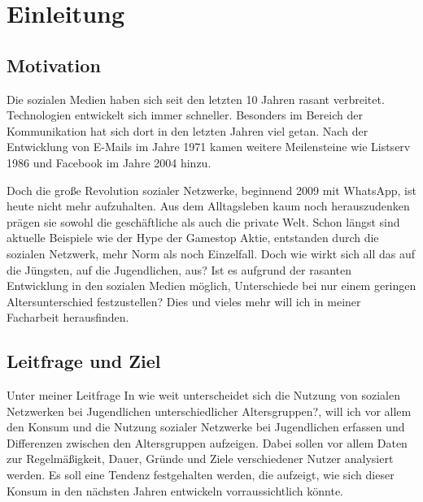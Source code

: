 \section{Einleitung}

\subsection{Motivation}

Die sozialen Medien haben sich seit den letzten 10 Jahren rasant verbreitet. Technologien entwickelt sich immer schneller. Besonders im Bereich der Kommunikation hat sich dort in den letzten Jahren viel getan. Nach der Entwicklung von E-Mails im Jahre 1971\cite{Kroker14.September.2020} kamen weitere Meilensteine wie Listserv 1986 und Facebook im Jahre 2004 hinzu.

Doch die große Revolution sozialer Netzwerke, beginnend 2009 mit WhatsApp, ist heute nicht mehr aufzuhalten. Aus dem Alltagsleben kaum noch herauszudenken prägen sie sowohl die geschäftliche als auch die private Welt. Schon längst sind aktuelle Beispiele wie der Hype der Gamestop Aktie\cite{Diedrich23.06.2021}, entstanden durch die sozialen Netzwerk,  mehr Norm als noch Einzelfall. Doch wie wirkt sich all das auf die Jüngsten, auf die Jugendlichen, aus? Ist es aufgrund der rasanten Entwicklung in den sozialen Medien möglich, Unterschiede bei nur einem geringen Altersunterschied festzustellen? Dies und vieles mehr will ich in meiner Facharbeit herausfinden.

\subsection{Leitfrage und Ziel}

Unter meiner Leitfrage \glqq In wie weit unterscheidet sich die Nutzung von sozialen Netzwerken bei Jugendlichen unterschiedlicher Altersgruppen?\grqq, will ich vor allem den Konsum und die Nutzung sozialer Netzwerke bei Jugendlichen erfassen und Differenzen zwischen den Altersgruppen aufzeigen. Dabei sollen vor allem Daten zur Regelmäßigkeit, Dauer, Gründe und Ziele verschiedener Nutzer analysiert werden. Es soll eine Tendenz festgehalten werden, die aufzeigt, wie sich dieser Konsum in den nächsten Jahren entwickeln vorraussichtlich könnte.